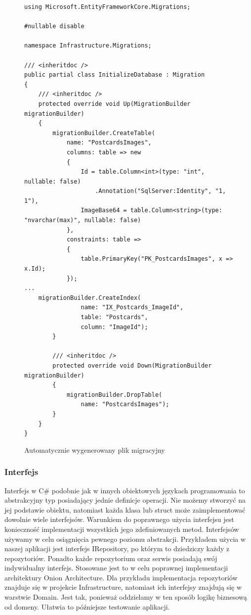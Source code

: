 \documentclass[a4paper,twoside,12pt]{book}
\begin{document}
\begin{figure}[H]
    \begin{lstlisting}
using Microsoft.EntityFrameworkCore.Migrations;

#nullable disable

namespace Infrastructure.Migrations;

/// <inheritdoc />
public partial class InitializeDatabase : Migration
{
    /// <inheritdoc />
    protected override void Up(MigrationBuilder migrationBuilder)
    {
        migrationBuilder.CreateTable(
            name: "PostcardsImages",
            columns: table => new
            {
                Id = table.Column<int>(type: "int", nullable: false)
                    .Annotation("SqlServer:Identity", "1, 1"),
                ImageBase64 = table.Column<string>(type: "nvarchar(max)", nullable: false)
            },
            constraints: table =>
            {
                table.PrimaryKey("PK_PostcardsImages", x => x.Id);
            });
...
    migrationBuilder.CreateIndex(
                name: "IX_Postcards_ImageId",
                table: "Postcards",
                column: "ImageId");
        }

        /// <inheritdoc />
        protected override void Down(MigrationBuilder migrationBuilder)
        {
            migrationBuilder.DropTable(
                name: "PostcardsImages");
        }
    }
}
    \end{lstlisting}
\caption{Automatycznie wygenerowany plik migracyjny}
\label{fig:pseudokod:listings}
\end{figure}

\subsubsection{Interfejs}
Interfejs w C\# podobnie jak w innych obiektowych językach programowania to abstrakcyjny typ posiadający jednie definicje operacji. Nie możemy stworzyć na jej podstawie obiektu, natomiast każda klasa lub struct może zaimplementować dowolnie wiele interfejsów. Warunkiem do poprawnego użycia interfejsu jest konieczność implementacji wszystkich jego zdefiniowanych metod. Interfejsów używamy w celu osiągnięcia pewnego poziomu abstrakcji. Przykładem użycia w naszej aplikacji jest interfejs IRepository, po którym to dziedziczy każdy z repozytoriów. Ponadto każde repozytorium oraz serwis posiadają swój indywidualny interfejs. Stosowane jest to w celu poprawnej implementacji architektury Onion Architecture. Dla przykładu implementacja repozytoriów znajduje się w projekcie Infrastructure, natomiast ich interfejsy znajdują się w warstwie Domain. Jest tak, ponieważ oddzielamy w ten sposób logikę biznesową od domeny. Ułatwia to późniejsze testowanie aplikacji. 
\end{document}
